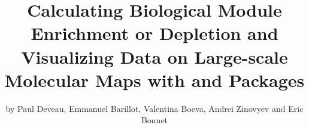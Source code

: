 
\author{by Paul Deveau, Emmanuel Barillot, Valentina Boeva, Andrei Zinovyev and Eric Bonnet} %
\title{Calculating Biological Module Enrichment or Depletion and Visualizing Data on Large-scale Molecular Maps with  and  Packages} %
\maketitle


